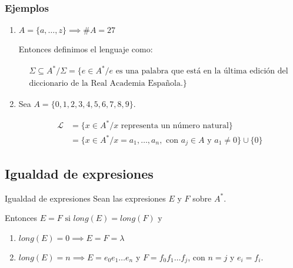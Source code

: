 \subsubsection{Ejemplos}

\begin{enumerate}
    \item $A = \{ a, \dotsc, z \} \implies \# A = 27$

        Entonces definimos el lenguaje como:
        
        \begin{gather*}
            \Sigma \subseteq A^{*} / \Sigma = \{ e \in A^{*} / e 
                \text{ es una palabra que está en la última edición del } \\ 
            \text{diccionario de la Real Academia Española.} \}
        \end{gather*}

    \item Sea $A = \{ 0, 1, 2, 3, 4, 5, 6, 7, 8, 9 \}$.

        \begin{align*}
            \mathcal{L} &= \{ x \in A^{*} / x 
            \text{ representa un número natural} \} \\
              &= \{ x \in A^{*} / x = a_1, \dotsc, a_n, \text{ con }
              a_j \in A \text{ y } a_1 \neq 0\} \cup \{ 0 \}
        \end{align*}
\end{enumerate}

\subsection{Igualdad de expresiones}


\begin{definicion}{Igualdad de expresiones}{}
    Sean las expresiones $E$ y $F$ sobre $A^*$.

    \medskip

    Entonces $E = F \text{ si } long(E) = long(F)$ y
    \begin{center}
    \begin{enumerate}[%
                    labelindent=*,
                    style=multiline,
                    leftmargin=*,
                    align=left,
                    leftmargin=2\parindent,
                    label=Caso \arabic*)]
        \item $long(E)= 0 \implies E = F = \lambda$
        \item $long(E) = n \implies E = e_0 e_1 \dots e_{n}$ y
            $F = f_0 f_1 \dots f_j$, con $n = j$ y $e_i = f_i$.
    \end{enumerate}
    \end{center}
\end{definicion}

